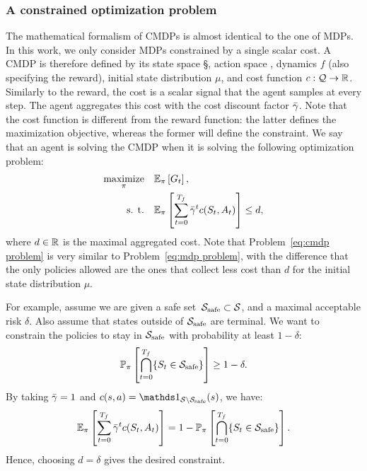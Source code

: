 		\subsubsection{A constrained optimization problem}
		The mathematical formalism of CMDPs is almost identical to the one of MDPs. In this work, we only consider MDPs constrained by a single scalar cost. A CMDP is therefore defined by its state space \S, action space \A, dynamics $f$ (also specifying the reward), initial state distribution $\mu$, and cost function $c: \Q\to\R$. Similarly to the reward, the cost is a scalar signal that the agent samples at every step. The agent aggregates this cost with the cost discount factor $\gammabar$. Note that the cost function is different from the reward function: the latter defines the maximization objective, whereas the former will define the constraint.
		We say that an agent is solving the CMDP when it is solving the following optimization problem:
		\begin{equation}
		\begin{aligned}
			\underset{\pi}{\text{maximize}} & \quad\expected_\pi\left[G_t\right], \\
			\text{s. t.} & \quad\expected_\pi\left[\sum_{t=0}^\Tf\gammabar^tc(S_t, A_t)\right] \leq d,
		\end{aligned} \label{eq:cmdp problem}
		\end{equation}
		where $d\in\R$ is the maximal aggregated cost. Note that Problem~\eqref{eq:cmdp problem} is very similar to Problem~\eqref{eq:mdp problem}, with the difference that the only policies allowed are the ones that collect less cost than $d$ for the initial state distribution $\mu$.
		
		\begin{example} \label{ex:chance constraints}
			For example, assume we are given a safe set~$\S_\text{safe}\subset\S$, and a maximal acceptable risk $\delta$. Also assume that states outside of $\S_\text{safe}$ are terminal. We want to constrain the policies to stay in $\S_\text{safe}$ with probability at least $1 - \delta$:
			\begin{equation*}
				\P_\pi\left[\bigcap_{t=0}^\Tf\{S_t\in\S_\text{safe}\}\right] \geq 1 - \delta.
			\end{equation*}
			By taking $\gammabar = 1$ and $c(s, a) = \indicator_{\S\setminus\S_\text{safe}}(s)$, we have:
			\begin{equation*}
			\expected_\pi\left[\sum_{t=0}^\Tf\gammabar^tc(S_t, A_t)\right] = 1 - \P_\pi\left[\bigcap_{t=0}^\Tf\{S_t\in\S_\text{safe}\}\right].
			\end{equation*}
			Hence, choosing $d = \delta$ gives the desired constraint.
		\end{example} 
